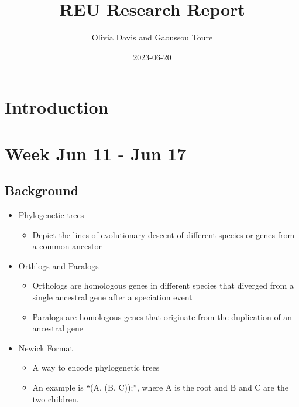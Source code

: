 \documentclass[
  11pt,
  letterpaper,
  oneside]{book}
\title{REU Research Report}
\author{Olivia Davis and Gaoussou Toure}
\date{2023-06-20}
\providecommand{\tightlist}{%
  \setlength{\itemsep}{0pt}\setlength{\parskip}{0pt}}\usepackage{longtable,booktabs,array}
\renewcommand*\contentsname{Table of contents}
\newcommand\contentsname{Table of contents}
\begin{document}
\frontmatter
\maketitle
\ifdefined\Shaded\renewenvironment{Shaded}{\begin{tcolorbox}[boxrule=0pt, frame hidden, colback={codebgcolor}, borderline west={3pt}{0pt}{shadecolor}, enhanced, breakable, sharp corners]}{\end{tcolorbox}}\fi

\renewcommand*\contentsname{Contents}
{
\hypersetup{linkcolor=}
\setcounter{tocdepth}{4}
\tableofcontents
}
\mainmatter
{}

\hypertarget{introduction}{%
\chapter*{Introduction}\label{introduction}}



\hypertarget{week-jun-11---jun-17}{%
\chapter{Week Jun 11 - Jun 17}\label{week-jun-11---jun-17}}

\hypertarget{background}{%
\section{Background}\label{background}}

\begin{itemize}
\tightlist
\item
  Phylogenetic trees

  \begin{itemize}
  \tightlist
  \item
    Depict the lines of evolutionary descent of different species or
    genes from a common ancestor
  \end{itemize}
\item
  Orthlogs and Paralogs

  \begin{itemize}
  \tightlist
  \item
    Orthologs are homologous genes in different species that diverged
    from a single ancestral gene after a speciation event
  \item
    Paralogs are homologous genes that originate from the duplication of
    an ancestral gene
  \end{itemize}
\item
  Newick Format

  \begin{itemize}
  \tightlist
  \item
    A way to encode phylogenetic trees
  \item
    An example is ``(A, (B, C));'', where A is the root and B and C are
    the two children.
  \end{itemize}
\end{itemize}
\end{document}
